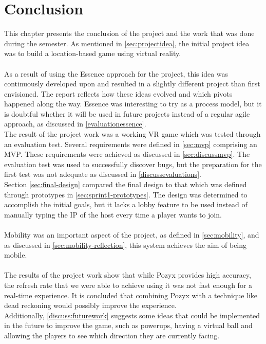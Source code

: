 \chapter{Conclusion}\label{chap:conclusion}
This chapter presents the conclusion of the project and the work that was done during the semester.
As mentioned in \autoref{sec:projectidea}, the initial project idea was to build a location-based game using virtual reality.\\
\\
As a result of using the Essence approach for the project, this idea was continuously developed upon and resulted in a slightly different project than first envisioned.
The report reflects how these ideas evolved and which pivots happened along the way.
Essence was interesting to try as a process model, but it is doubtful whether it will be used in future projects instead of a regular agile approach, as discussed in \autoref{evaluationessence}.
\\
The result of the project work was a working VR game which was tested through an evaluation test.
Several requirements were defined in \autoref{sec:mvp} comprising an MVP.
These requirements were achieved as discussed in \autoref{sec:discussmvp}.
The evaluation test was used to successfully discover bugs, but the preparation for the first test was not adequate as discussed in \autoref{discussevaluations}.
\\
Section \ref{sec:final-design} compared the final design to that which was defined through prototypes in \autoref{sec:sprint1-prototypes}.
The design was determined to accomplish the initial goals, but it lacks a lobby feature to be used instead of manually typing the IP of the host every time a player wants to join.
\\\\
Mobility was an important aspect of the project, as defined in \autoref{sec:mobility}, and as discussed in \autoref{sec:mobility-reflection}, this system achieves the aim of being mobile.
\\\\
The results of the project work show that while Pozyx provides high accuracy, the refresh rate that we were able to achieve using it was not fast enough for a real-time experience.
It is concluded that combining Pozyx with a technique like dead reckoning would possibly improve the experience.
\\
Additionally, \autoref{discuss:futurework} suggests some ideas that could be implemented in the future to improve the game, such as powerups, having a virtual ball and allowing the players to see which direction they are currently facing.
